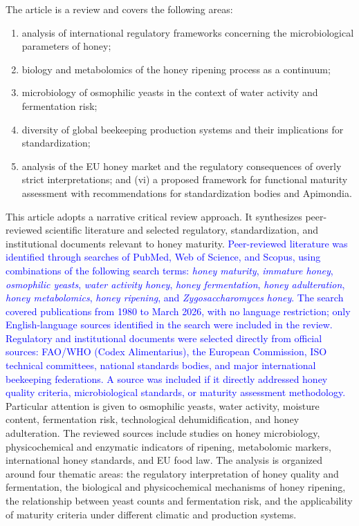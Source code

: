 The article is a review and covers the following areas:
\begin{enumerate}
    \item analysis of international regulatory frameworks concerning the microbiological parameters of honey; 
    \item biology and metabolomics of the honey ripening process as a continuum;
    \item microbiology of osmophilic yeasts in the context of water activity and fermentation risk; 
    \item diversity of global beekeeping production systems and their implications for standardization; 
    \item analysis of the EU honey market and the regulatory consequences of overly strict interpretations; and (vi) a proposed framework for functional maturity assessment with recommendations for standardization bodies and Apimondia.
\end{enumerate}

This article adopts a narrative critical review approach. It synthesizes peer-reviewed scientific literature and selected regulatory, standardization, and institutional documents relevant to honey maturity. %
\textcolor{blue}{Peer-reviewed literature was identified through searches of PubMed, Web of Science, and Scopus, using combinations of the following search terms: \textit{honey maturity}, \textit{immature honey}, \textit{osmophilic yeasts}, \textit{water activity honey}, \textit{honey fermentation}, \textit{honey adulteration}, \textit{honey metabolomics}, \textit{honey ripening}, and \textit{Zygosaccharomyces honey}. The search covered publications from 1980 to March 2026, with no language restriction; only English-language sources identified in the search were included in the review. Regulatory and institutional documents were selected directly from official sources: FAO/WHO (Codex Alimentarius), the European Commission, ISO technical committees, national standards bodies, and major international beekeeping federations. A source was included if it directly addressed honey quality criteria, microbiological standards, or maturity assessment methodology.} Particular attention is given to osmophilic yeasts, water activity, moisture content, fermentation risk, technological dehumidification, and honey adulteration. The reviewed sources include studies on honey microbiology, physicochemical and enzymatic indicators of ripening, metabolomic markers, international honey standards, and EU food law. The analysis is organized around four thematic areas: the regulatory interpretation of honey quality and fermentation, the biological and physicochemical mechanisms of honey ripening, the relationship between yeast counts and fermentation risk, and the applicability of maturity criteria under different climatic and production systems.
